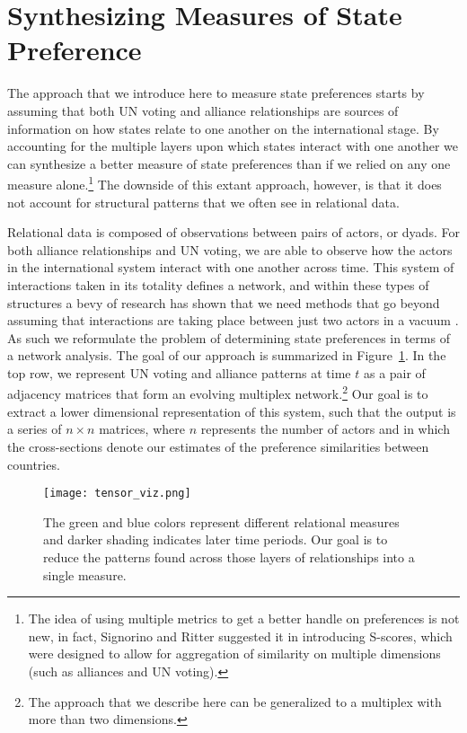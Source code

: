 \section*{Synthesizing Measures of State Preference}

The approach that we introduce here to measure state preferences starts by assuming that both UN voting and alliance relationships are sources of information on how states relate to one another on the international stage. By accounting for the multiple layers upon which states interact with one another we can synthesize a better measure of state preferences than if we relied on any one measure alone.\footnote{The idea of using multiple metrics to get a better handle on preferences is not new, in fact, Signorino and Ritter suggested it in introducing S-scores, which were designed to allow for aggregation of similarity on multiple dimensions (such as alliances and UN voting).} The downside of this extant approach, however, is that it does not account for structural patterns that we often see in relational data. 

Relational data is composed of observations between pairs of actors, or dyads. For both alliance relationships and UN voting, we are able to observe how the actors in the international system interact with one another across time. This system of interactions taken in its totality defines a network, and within these types of structures a bevy of research has shown that we need methods that go beyond assuming that interactions are taking place between just two actors in a vacuum \citep{wasserman:faust:1994,snijders:nowicki:1997}. As such we reformulate the problem of determining state preferences in terms of a network analysis. The goal of our approach is summarized in Figure~\ref{fig:tensViz}. In the top row, we represent UN voting and alliance patterns at time $t$ as a pair of adjacency matrices that form an evolving multiplex network.\footnote{The approach that we describe here can be generalized to a multiplex with more than two dimensions.} Our goal is to extract a lower dimensional representation of this system, such that the output is a series of $n \times n$ matrices, where $n$ represents the number of actors and in which the cross-sections denote our estimates of the preference similarities between countries.

\begin{figure}[ht]
	\centering
	\texttt{[image: tensor\_viz.png]}
	\caption{The green and blue colors represent different relational measures and darker shading indicates later time periods. Our goal is to reduce the patterns found across those layers of relationships into a single measure.}
	\label{fig:tensViz}
\end{figure}

